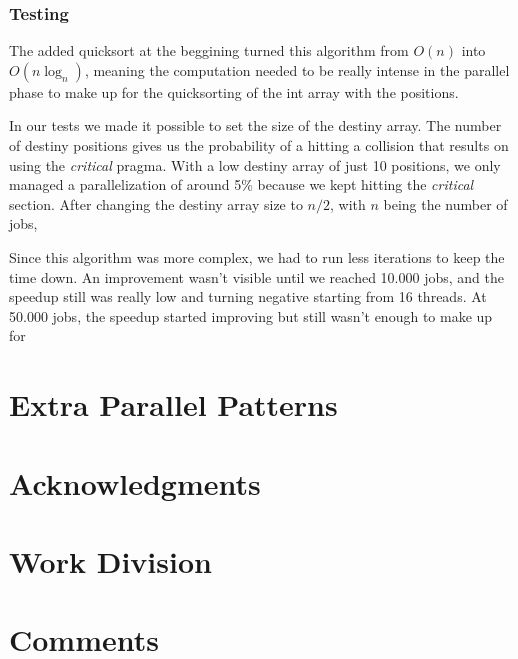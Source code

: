 \documentclass[9pt,journal]{IEEEtran}
\begin{document}
\subsubsection{Testing}
The added quicksort at the beggining turned this algorithm from $ O(n) $ into $ O(n\log_n) $, meaning the computation needed to be really intense in the parallel phase to make up for the quicksorting of the int array with the positions. 

In our tests we made it possible to set the size of the destiny array. The number of destiny positions gives us the probability of a hitting a collision that results on using the \textit{critical} pragma. With a low destiny array of just 10 positions, we only managed a parallelization of around 5\% because we kept hitting the \textit{critical} section. After changing the destiny array size to $ n / 2 $, with $ n $ being the number of jobs, 

Since this algorithm was more complex, we had to run less iterations to keep the time down. An improvement wasn't visible until we reached 10.000 jobs, and the speedup still was really low and turning negative starting from 16 threads. At 50.000 jobs, the speedup started improving but still wasn't enough to make up for 

\section{Extra Parallel Patterns}

\section{Acknowledgments}


{}

\section{Work Division}

\section{Comments}
\end{document}
